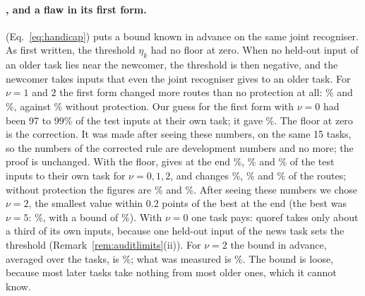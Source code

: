 \paragraph{\handicap{}, and a flaw in its first form.} \handicap{} (Eq.~\eqref{eq:handicap}) puts a bound known in advance on the same joint recogniser.
As first written, the threshold $\eta_k$ had no floor at zero.
When no held-out input of an older task lies near the newcomer, the threshold is then negative, and the newcomer takes inputs that even the joint recogniser gives to an older task.
For $\nu = 1$ and $2$ the first form changed more routes than no protection at all: \AudDevHTOneChanged{}\% and \AudDevHTTwoChanged{}\%, against \AudDevHPrimeTNoneChanged{}\% without protection. Our guess for the first form with $\nu = 0$ had been 97 to 99\% of the test inputs at their own task; it gave \AudDevHTZeroEnd{}\%.
The floor at zero is the correction.
It was made after seeing these numbers, on the same 15 tasks, so the numbers of the corrected rule are development numbers and no more; the proof is unchanged.
With the floor, \handicap{} gives at the end \AudDevHPrimeTZeroEnd{}\%, \AudDevHPrimeTOneEnd{}\% and \AudDevHPrimeTTwoEnd{}\% of the test inputs to their own task for $\nu = 0, 1, 2$, and changes \AudDevHPrimeTZeroChanged{}\%, \AudDevHPrimeTOneChanged{}\% and \AudDevHPrimeTTwoChanged{}\% of the routes; without protection the figures are \AudDevHPrimeTNoneEnd{}\% and \AudDevHPrimeTNoneChanged{}\%.
After seeing these numbers we chose $\nu = 2$, the smallest value within 0.2 points of the best at the end (the best was $\nu = 5$: \AudDevHPrimeTFiveEnd{}\%, with a bound of \AudDevHPrimeTFiveBound{}\%).
With $\nu = 0$ one task pays: quoref takes only about a third of its own inputs, because one held-out input of the news task sets the threshold (Remark~\ref{rem:auditlimits}(ii)).
For $\nu = 2$ the bound in advance, averaged over the tasks, is \AudDevHPrimeTTwoBound{}\%; what was measured is \AudDevHPrimeTTwoChanged{}\%.
The bound is loose, because most later tasks take nothing from most older ones, which it cannot know.

